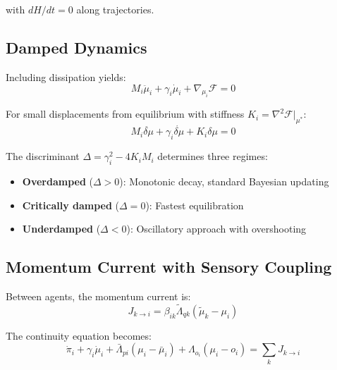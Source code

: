 \documentclass[12pt]{article}
\begin{document}
with $dH/dt = 0$ along trajectories.

\subsection{Damped Dynamics}

Including dissipation yields:
\begin{equation}
M_i\ddot{\mu}_i + \gamma_i\dot{\mu}_i + \nabla_{\mu_i}\mathcal{F} = 0
\label{eq:damped_dynamics}
\end{equation}

For small displacements from equilibrium with stiffness $K_i = \nabla^2\mathcal{F}|_{\mu^*}$:
\begin{equation}
M_i\ddot{\delta\mu} + \gamma_i\dot{\delta\mu} + K_i\delta\mu = 0
\end{equation}

The discriminant $\Delta = \gamma_i^2 - 4K_iM_i$ determines three regimes:
\begin{itemize}
    \item \textbf{Overdamped} ($\Delta > 0$): Monotonic decay, standard Bayesian updating
    \item \textbf{Critically damped} ($\Delta = 0$): Fastest equilibration
    \item \textbf{Underdamped} ($\Delta < 0$): Oscillatory approach with overshooting
\end{itemize}

\subsection{Momentum Current with Sensory Coupling}

Between agents, the momentum current is:
\begin{equation}
J_{k \to i} = \beta_{ik}\tilde{\Lambda}_{qk}(\tilde{\mu}_k - \mu_i)
\end{equation}

The continuity equation becomes:
\begin{equation}
\dot{\pi}_i + \gamma_i\dot{\mu}_i + \bar{\Lambda}_{pi}(\mu_i - \bar{\mu}_i) + \Lambda_{o_i}(\mu_i - o_i) = \sum_k J_{k \to i}
\end{equation}
\end{document}
